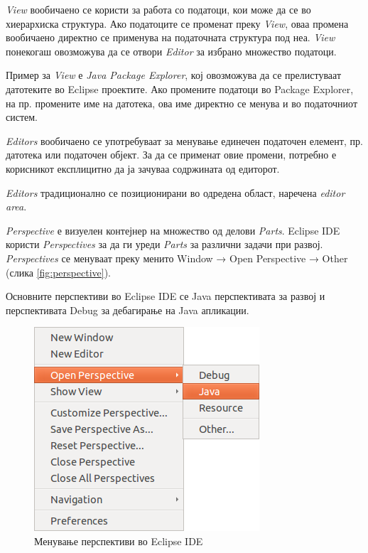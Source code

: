 \emph{View} вообичаено се користи за работа со податоци, кои може да се во
хиерархиска структура. Ако податоците се променат преку \emph{View}, оваа
промена вообичаено директно се применува на податочната структура под неа.
\emph{View} понекогаш овозможува да се отвори \emph{Editor} за избрано множество
податоци.

Пример за \emph{View} е \emph{Java Package Explorer}, кој овозможува да се
прелистуваат датотеките во Eclipse проектите. Ако промените податоци во Package
Explorer, на пр. промените име на датотека, ова име директно се менува и во
податочниот систем.

\emph{Editors} вообичаено се употребуваат за менување единечен податочен
елемент, пр. датотека или податочен објект. За да се применат овие промени,
потребно е корисникот експлицитно да ја зачуваа содржината од едиторот.

\emph{Editors} традиционално се позиционирани во одредена област, наречена
\emph{editor area}.


\emph{Perspective} е визуелен контејнер на множество од делови \emph{Parts}.
Eclipse IDE користи \emph{Perspectives} за да ги уреди \emph{Parts} за
различни задачи при развој. \emph{Perspectives} се менуваат преку менито Window
→ Open Perspective → Other (слика \ref{fig:perspective}).

Основните перспективи во Eclipse IDE се Java перспективата за развој и
перспективата Debug за дебагирање на Java апликации.

\begin{figure}[htb]
\centering
\includegraphics[scale=.5]{images/perspective}
\caption{Менување перспективи во Eclipse IDE}
\label{ref:perspective}
\end{figure}

